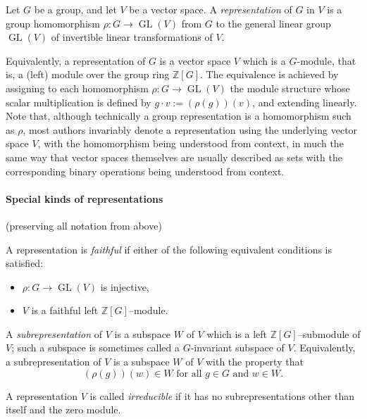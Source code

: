 \documentclass{article}
\begin{document}
Let $G$ be a group, and let $V$ be a vector space. A \emph{representation} of $G$ in $V$ is a group homomorphism $\rho\colon G \to \operatorname{GL}(V)$ from $G$ to the general linear group $\operatorname{GL}(V)$ of invertible linear transformations of $V$.

Equivalently, a representation of $G$ is a vector space $V$ which is a $G$-module, that is, a (left) module over the group ring $\mathbb{Z}[G]$. The equivalence is achieved by assigning to each homomorphism $\rho\colon G \to \operatorname{GL}(V)$ the module structure whose scalar multiplication is defined by $g \cdot v := (\rho(g))(v)$, and extending linearly. Note that, although technically a group representation is a homomorphism such as $\rho$, most authors invariably denote a representation using the underlying vector space $V$, with the homomorphism being understood from context, in much the same way that vector spaces themselves are usually described as sets with the corresponding binary operations being understood from context.

\paragraph{Special kinds of representations}

(preserving all notation from above)

A representation is \emph{faithful} if either of the following equivalent conditions is satisfied:
\begin{itemize}
\item $\rho\colon G \to \operatorname{GL}(V)$ is injective,
\item $V$ is a faithful left $\mathbb{Z}[G]$--module.
\end{itemize}

A \emph{subrepresentation} of $V$ is a subspace $W$ of $V$ which is a left $\mathbb{Z}[G]$--submodule of $V$;
 such a subspace is sometimes called a $G$-invariant subspace of $V$. Equivalently, a subrepresentation of $V$ is a subspace $W$ of $V$ with the property that
$$
(\rho(g))(w) \in W \text{ for all } g \in G \text{ and } w \in W.
$$

A representation $V$ is called {\em irreducible} if it has no subrepresentations other than itself and the zero module.
\end{document}
